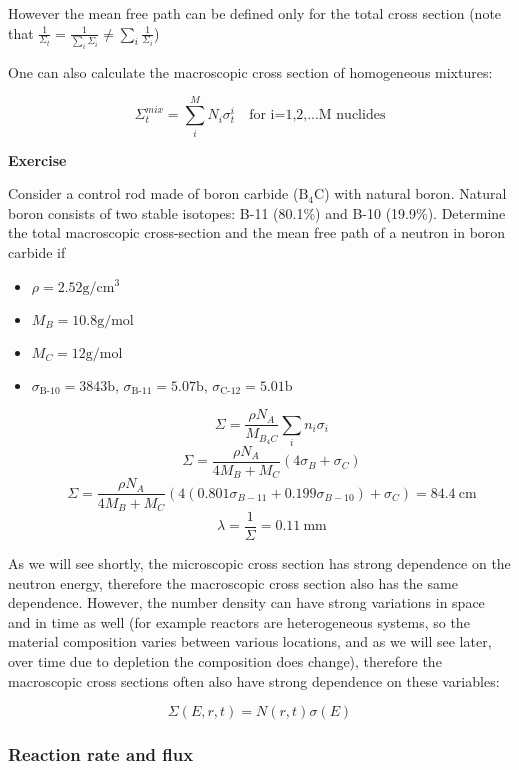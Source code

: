However the mean free path can be defined only for the total cross section (note that $\frac{1}{\Sigma_t} = \frac{1}{\sum\limits_i \Sigma_i}\neq \sum\limits_i\frac{1}{\Sigma_i}$)

One can also calculate the macroscopic cross section of homogeneous mixtures:

\[
\Sigma_t^{mix}=\sum\limits_i^M N_i\sigma_t^i \quad \text{for i=1,2,...M nuclides}
\]

\begin{tcolorbox}
\textbf{Exercise}

Consider a control rod made of boron carbide ($\text{B}_4\text{C}$) with natural boron. Natural boron consists of two stable isotopes: B-11 (80.1\%) and B-10 (19.9\%). Determine the total macroscopic cross-section and the mean free path of a neutron in boron carbide if
\begin{itemize}
\item $\rho = 2.52\text{g}/\text{cm}^3$
\item $M_B = 10.8\text{g}/\text{mol}$
\item $M_C = 12\text{g}/\text{mol}$
\item $\sigma_{\text{B-10}}=3843 \text{b}$, $\sigma_{\text{B-11}}=5.07 \text{b}$, $\sigma_{\text{C-12}}=5.01 \text{b}$

$$\Sigma=\frac{\rho N_A}{M_{B_4C}}\sum_in_i\sigma_i$$
$$\Sigma=\frac{\rho N_A}{4M_{B}+M_{C}}(4\sigma_B+\sigma_C)$$
$$\Sigma=\frac{\rho N_A}{4M_{B}+M_{C}}(4(0.801\sigma_{B-11}+0.199\sigma_{B-10})+\sigma_C)=84.4 \: \text{cm}$$
$$\lambda=\frac{1}{\Sigma}=0.11\:\text{mm}$$
\end{itemize}
 \end{tcolorbox}

As we will see shortly, the microscopic cross section has strong dependence on the neutron energy, therefore the macroscopic cross section also has the same dependence. However, the number density can have strong variations in space and in time as well (for example reactors are heterogeneous systems, so the material composition varies between various locations, and as we will see later, over time due to depletion the composition does change), therefore the macroscopic cross sections often also have strong dependence on these variables:

\[
\Sigma (E, r, t)=N(r,t)\sigma (E)
\]

\subsubsection{Reaction rate and flux}

